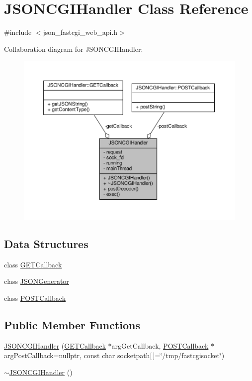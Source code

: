 \hypertarget{classJSONCGIHandler}{}\section{J\+S\+O\+N\+C\+G\+I\+Handler Class Reference}
\label{classJSONCGIHandler}


{\ttfamily \#include $<$json\+\_\+fastcgi\+\_\+web\+\_\+api.\+h$>$}



Collaboration diagram for J\+S\+O\+N\+C\+G\+I\+Handler\+:
\nopagebreak
\begin{figure}[H]
\begin{center}
\leavevmode
\includegraphics[width=350pt]{classJSONCGIHandler__coll__graph}
\end{center}
\end{figure}
\subsection*{Data Structures}
\begin{DoxyCompactItemize}
\item 
class \hyperlink{classJSONCGIHandler_1_1GETCallback}{G\+E\+T\+Callback}
\item 
class \hyperlink{classJSONCGIHandler_1_1JSONGenerator}{J\+S\+O\+N\+Generator}
\item 
class \hyperlink{classJSONCGIHandler_1_1POSTCallback}{P\+O\+S\+T\+Callback}
\end{DoxyCompactItemize}
\subsection*{Public Member Functions}
\begin{DoxyCompactItemize}
\item 
\hyperlink{classJSONCGIHandler_a9bf5a96d13949d363225561ba6ac3b56}{J\+S\+O\+N\+C\+G\+I\+Handler} (\hyperlink{classJSONCGIHandler_1_1GETCallback}{G\+E\+T\+Callback} $\ast$arg\+Get\+Callback, \hyperlink{classJSONCGIHandler_1_1POSTCallback}{P\+O\+S\+T\+Callback} $\ast$arg\+Post\+Callback=nullptr, const char socketpath\mbox{[}$\,$\mbox{]}=\char`\"{}/tmp/fastcgisocket\char`\"{})
\item 
\hyperlink{classJSONCGIHandler_a4817e428a962bdea68123f2d32671f30}{$\sim$\+J\+S\+O\+N\+C\+G\+I\+Handler} ()
\end{DoxyCompactItemize}
